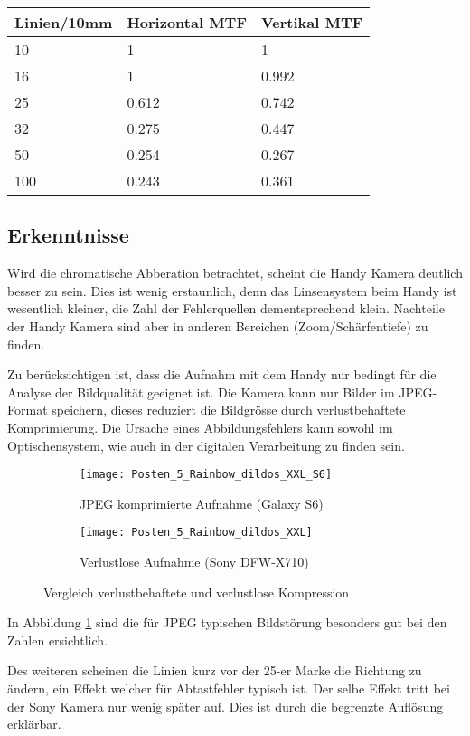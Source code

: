 \begin{table}[h!]
  \centering
  \begin{tabular}{l | l | l }
    Linien/10mm & Horizontal MTF &  Vertikal MTF \\\hline
    10 & 1 &  1\\
    16 & 1 & 0.992\\
    25 & 0.612 & 0.742 \\
    32 & 0.275 & 0.447 \\
    50 & 0.254 & 0.267 \\
    100 & 0.243 & 0.361 \\
  \end{tabular}
\end{table}

\newpage
\subsection{Erkenntnisse}
Wird die chromatische Abberation betrachtet, scheint die Handy Kamera deutlich besser zu sein.
Dies ist wenig erstaunlich, denn das Linsensystem beim Handy ist wesentlich kleiner, die Zahl der Fehlerquellen dementsprechend klein. Nachteile der Handy Kamera sind aber in anderen Bereichen (Zoom/Schärfentiefe) zu finden.

Zu berücksichtigen ist, dass die Aufnahm mit dem Handy nur bedingt für die Analyse der Bildqualität geeignet ist.
Die Kamera kann nur Bilder im JPEG-Format speichern, dieses reduziert die Bildgrösse
durch verlustbehaftete Komprimierung. Die Ursache eines Abbildungsfehlers kann sowohl im Optischensystem, wie auch in der digitalen Verarbeitung zu finden sein.

\begin{figure}[h!]
  \centering
  \begin{subfigure}[t]{0.49\textwidth}
    \centering
    \texttt{[image: Posten\_5\_Rainbow\_dildos\_XXL\_S6]}
    \caption{JPEG komprimierte Aufnahme (Galaxy S6)}
  \end{subfigure}
  \begin{subfigure}[t]{0.49\textwidth}
    \centering
    \texttt{[image: Posten\_5\_Rainbow\_dildos\_XXL]}
    \caption{Verlustlose Aufnahme (Sony DFW-X710)}
  \end{subfigure}
  \caption{Vergleich verlustbehaftete und verlustlose Kompression}
  \label{fig:p5sc}
\end{figure}

In Abbildung \ref{fig:p5sc} sind die für JPEG typischen Bildstörung besonders gut bei den Zahlen ersichtlich.

Des weiteren scheinen die Linien kurz vor der 25-er Marke die Richtung zu ändern,
ein Effekt welcher für Abtastfehler typisch ist. Der selbe Effekt tritt bei der Sony Kamera nur wenig später auf. Dies ist durch die begrenzte Auflösung erklärbar.

